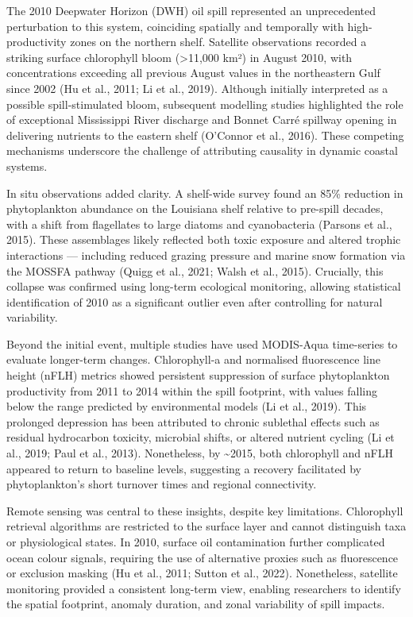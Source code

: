 \documentclass[
  11pt,
]{article}
\begin{document}
The 2010 Deepwater Horizon (DWH) oil spill represented an unprecedented
perturbation to this system, coinciding spatially and temporally with
high-productivity zones on the northern shelf. Satellite observations
recorded a striking surface chlorophyll bloom (\textgreater11,000 km²)
in August 2010, with concentrations exceeding all previous August values
in the northeastern Gulf since 2002 (Hu et al., 2011; Li et al., 2019).
Although initially interpreted as a possible spill-stimulated bloom,
subsequent modelling studies highlighted the role of exceptional
Mississippi River discharge and Bonnet Carré spillway opening in
delivering nutrients to the eastern shelf (O'Connor et al., 2016). These
competing mechanisms underscore the challenge of attributing causality
in dynamic coastal systems.

In situ observations added clarity. A shelf-wide survey found an 85\%
reduction in phytoplankton abundance on the Louisiana shelf relative to
pre-spill decades, with a shift from flagellates to large diatoms and
cyanobacteria (Parsons et al., 2015). These assemblages likely reflected
both toxic exposure and altered trophic interactions --- including
reduced grazing pressure and marine snow formation via the MOSSFA
pathway (Quigg et al., 2021; Walsh et al., 2015). Crucially, this
collapse was confirmed using long-term ecological monitoring, allowing
statistical identification of 2010 as a significant outlier even after
controlling for natural variability.

Beyond the initial event, multiple studies have used MODIS-Aqua
time-series to evaluate longer-term changes. Chlorophyll-a and
normalised fluorescence line height (nFLH) metrics showed persistent
suppression of surface phytoplankton productivity from 2011 to 2014
within the spill footprint, with values falling below the range
predicted by environmental models (Li et al., 2019). This prolonged
depression has been attributed to chronic sublethal effects such as
residual hydrocarbon toxicity, microbial shifts, or altered nutrient
cycling (Li et al., 2019; Paul et al., 2013). Nonetheless, by
\textasciitilde2015, both chlorophyll and nFLH appeared to return to
baseline levels, suggesting a recovery facilitated by phytoplankton's
short turnover times and regional connectivity.

Remote sensing was central to these insights, despite key limitations.
Chlorophyll retrieval algorithms are restricted to the surface layer and
cannot distinguish taxa or physiological states. In 2010, surface oil
contamination further complicated ocean colour signals, requiring the
use of alternative proxies such as fluorescence or exclusion masking (Hu
et al., 2011; Sutton et al., 2022). Nonetheless, satellite monitoring
provided a consistent long-term view, enabling researchers to identify
the spatial footprint, anomaly duration, and zonal variability of spill
impacts.
\end{document}
